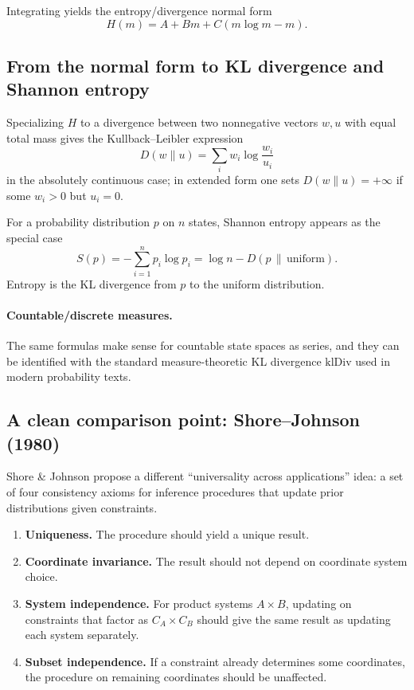 \documentclass[11pt]{article}
\theoremstyle{definition}
\theoremstyle{remark}
\begin{document}
Integrating yields the entropy/divergence normal form
\[
H(m)=A + Bm + C(m\log m - m).
\]

\subsection{From the normal form to KL divergence and Shannon entropy}

Specializing $H$ to a divergence between two nonnegative vectors $w,u$ with equal total mass gives
the Kullback--Leibler expression
\[
D(w\|u)=\sum_i w_i\log\frac{w_i}{u_i}
\]
in the absolutely continuous case; in extended form one sets $D(w\|u)=+\infty$ if some $w_i>0$ but $u_i=0$.

For a probability distribution $p$ on $n$ states, Shannon entropy appears as the special case
\[
S(p) = -\sum_{i=1}^n p_i\log p_i = \log n - D(p\,\|\,\mathrm{uniform}).
\]
Entropy is the KL divergence from $p$ to the uniform distribution.

\paragraph{Countable/discrete measures.}
The same formulas make sense for countable state spaces as series, and they can be identified with the
standard measure-theoretic KL divergence $\mathrm{klDiv}$ used in modern probability texts.

\subsection{A clean comparison point: Shore--Johnson (1980)}

Shore \& Johnson propose a different ``universality across applications'' idea: a set of four
consistency axioms for inference procedures that update prior distributions given constraints.
\begin{enumerate}
  \item \textbf{Uniqueness.} The procedure should yield a unique result.
  \item \textbf{Coordinate invariance.} The result should not depend on coordinate system choice.
  \item \textbf{System independence.} For product systems $A \times B$, updating on constraints that
    factor as $C_A \times C_B$ should give the same result as updating each system separately.
  \item \textbf{Subset independence.} If a constraint already determines some coordinates, the
    procedure on remaining coordinates should be unaffected.
\end{enumerate}
\end{document}

